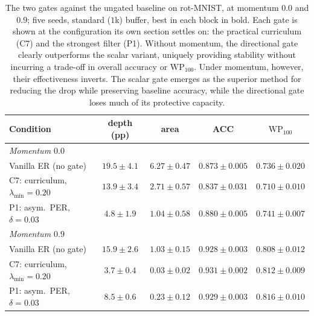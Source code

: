 \begin{table}[htbp]
    \centering
    \small
    \begin{tabular}{l cccc}
        \hline
        Condition                               & depth (pp)             & area                     & ACC                        & $\mathrm{WP}_{100}$        \\
        \hline
        \multicolumn{5}{l}{\emph{Momentum $0.0$}}                                                                                                             \\
        Vanilla ER (no gate)                    & $19.5 \pm 4.1$         & $6.27 \pm 0.47$          & $0.873 \pm 0.005$          & $0.736 \pm 0.020$          \\
        C7: curriculum, $\lambda_{\min}{=}0.20$ & $13.9 \pm 3.4$         & $2.71 \pm 0.57$          & $0.837 \pm 0.031$          & $0.710 \pm 0.010$          \\
        P1: asym.\ PER, $\delta{=}0.03$         & $\mathbf{4.8 \pm 1.9}$ & $\mathbf{1.04 \pm 0.58}$ & $\mathbf{0.880 \pm 0.005}$ & $\mathbf{0.741 \pm 0.007}$ \\
        \hline
        \multicolumn{5}{l}{\emph{Momentum $0.9$}}                                                                                                             \\
        Vanilla ER (no gate)                    & $15.9 \pm 2.6$         & $1.03 \pm 0.15$          & $0.928 \pm 0.003$          & $0.808 \pm 0.012$          \\
        C7: curriculum, $\lambda_{\min}{=}0.20$ & $\mathbf{3.7 \pm 0.4}$ & $\mathbf{0.03 \pm 0.02}$ & $\mathbf{0.931 \pm 0.002}$ & $0.812 \pm 0.009$          \\
        P1: asym.\ PER, $\delta{=}0.03$         & $8.5 \pm 0.6$          & $0.23 \pm 0.12$          & $0.929 \pm 0.003$          & $\mathbf{0.816 \pm 0.010}$ \\
        \hline
    \end{tabular}
    \caption{The two gates against the ungated baseline on rot-MNIST, at momentum $0.0$ and $0.9$; five seeds, standard ($1$k) buffer, best in each block in bold. Each gate is shown at the configuration its own section settles on: the practical curriculum (C7) and the strongest filter (P1). Without momentum, the directional gate clearly outperforms the scalar variant, uniquely providing stability without incurring a trade-off in overall accuracy or $\mathrm{WP}_{100}$. Under momentum, however, their effectiveness inverts. The scalar gate emerges as the superior method for reducing the drop while preserving baseline accuracy, while the directional gate loses much of its protective capacity.}
    \label{tab:res_gates}
\end{table}

